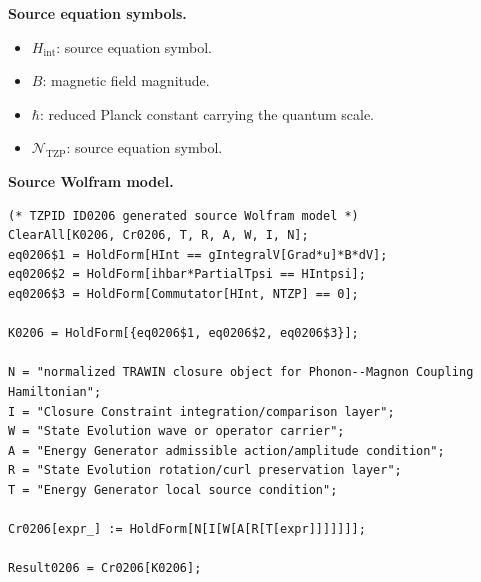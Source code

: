 \begin{minipage}[t]{0.49\linewidth}
\begingroup
\small
\raggedright
\textbf{Source equation symbols.}\par
\begin{itemize}[leftmargin=1.35em,itemsep=1pt,topsep=1pt,parsep=0pt]
    \item $H_{\mathrm{int}}$: source equation symbol.
    \item $B$: magnetic field magnitude.
    \item $\hbar$: reduced Planck constant carrying the quantum scale.
    \item $\mathcal{N}_{\mathrm{TZP}}$: source equation symbol.
\end{itemize}
\endgroup
\end{minipage}\hfill
\begin{minipage}[t]{0.47\linewidth}
\begingroup
\scriptsize
\raggedright
\textbf{Source Wolfram model.}\par
\begin{Verbatim}[fontsize=\tiny,breaklines=true,breakanywhere=true]
(* TZPID ID0206 generated source Wolfram model *)
ClearAll[K0206, Cr0206, T, R, A, W, I, N];
eq0206$1 = HoldForm[HInt == gIntegralV[Grad*u]*B*dV];
eq0206$2 = HoldForm[ihbar*PartialTpsi == HIntpsi];
eq0206$3 = HoldForm[Commutator[HInt, NTZP] == 0];

K0206 = HoldForm[{eq0206$1, eq0206$2, eq0206$3}];

N = "normalized TRAWIN closure object for Phonon--Magnon Coupling Hamiltonian";
I = "Closure Constraint integration/comparison layer";
W = "State Evolution wave or operator carrier";
A = "Energy Generator admissible action/amplitude condition";
R = "State Evolution rotation/curl preservation layer";
T = "Energy Generator local source condition";

Cr0206[expr_] := HoldForm[N[I[W[A[R[T[expr]]]]]]];

Result0206 = Cr0206[K0206];
\end{Verbatim}
\endgroup
\end{minipage}

